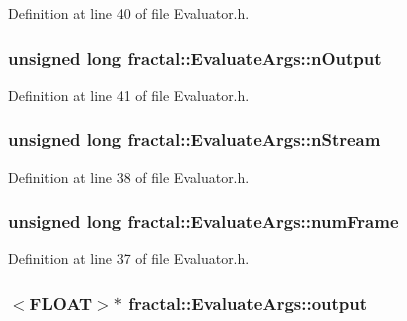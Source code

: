 Definition at line 40 of file Evaluator.\+h.

\hypertarget{classfractal_1_1EvaluateArgs_acadb8c401ebd94bf13b410337e5bd48f}{
\subsubsection[{n\+Output}]{\setlength{\rightskip}{0pt plus 5cm}unsigned long fractal\+::\+Evaluate\+Args\+::n\+Output}}\label{classfractal_1_1EvaluateArgs_acadb8c401ebd94bf13b410337e5bd48f}


Definition at line 41 of file Evaluator.\+h.

\hypertarget{classfractal_1_1EvaluateArgs_a3cff560e1489ef23f330cde1401cfa17}{
\subsubsection[{n\+Stream}]{\setlength{\rightskip}{0pt plus 5cm}unsigned long fractal\+::\+Evaluate\+Args\+::n\+Stream}}\label{classfractal_1_1EvaluateArgs_a3cff560e1489ef23f330cde1401cfa17}


Definition at line 38 of file Evaluator.\+h.

\hypertarget{classfractal_1_1EvaluateArgs_a3ec9fe1a96427e11893c7d112f0772a3}{
\subsubsection[{num\+Frame}]{\setlength{\rightskip}{0pt plus 5cm}unsigned long fractal\+::\+Evaluate\+Args\+::num\+Frame}}\label{classfractal_1_1EvaluateArgs_a3ec9fe1a96427e11893c7d112f0772a3}


Definition at line 37 of file Evaluator.\+h.

\hypertarget{classfractal_1_1EvaluateArgs_a1d08b06d5c6c57834227a770b86ce9cc}{
\subsubsection[{output}]{$<${\bf F\+L\+O\+A\+T}$>$$\ast$ fractal\+::\+Evaluate\+Args\+::output}}\label{classfractal_1_1EvaluateArgs_a1d08b06d5c6c57834227a770b86ce9cc}


